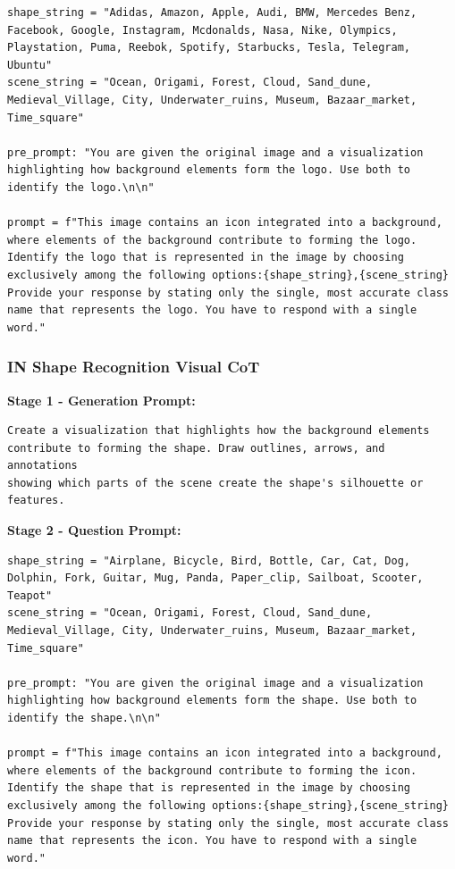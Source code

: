 \documentclass{article}
\theoremstyle{plain}
\theoremstyle{definition}
\theoremstyle{remark}
\begin{document}
\begin{verbatim}
shape_string = "Adidas, Amazon, Apple, Audi, BMW, Mercedes Benz,
Facebook, Google, Instagram, Mcdonalds, Nasa, Nike, Olympics,
Playstation, Puma, Reebok, Spotify, Starbucks, Tesla, Telegram, Ubuntu"
scene_string = "Ocean, Origami, Forest, Cloud, Sand_dune,
Medieval_Village, City, Underwater_ruins, Museum, Bazaar_market,
Time_square"

pre_prompt: "You are given the original image and a visualization
highlighting how background elements form the logo. Use both to
identify the logo.\n\n"

prompt = f"This image contains an icon integrated into a background,
where elements of the background contribute to forming the logo.
Identify the logo that is represented in the image by choosing
exclusively among the following options:{shape_string},{scene_string}
Provide your response by stating only the single, most accurate class
name that represents the logo. You have to respond with a single word."
\end{verbatim}

\subsubsection{IN Shape Recognition Visual CoT}

\textbf{Stage 1 - Generation Prompt:}

\begin{verbatim}
Create a visualization that highlights how the background elements
contribute to forming the shape. Draw outlines, arrows, and annotations
showing which parts of the scene create the shape's silhouette or
features.
\end{verbatim}

\textbf{Stage 2 - Question Prompt:}

\begin{verbatim}
shape_string = "Airplane, Bicycle, Bird, Bottle, Car, Cat, Dog,
Dolphin, Fork, Guitar, Mug, Panda, Paper_clip, Sailboat, Scooter,
Teapot"
scene_string = "Ocean, Origami, Forest, Cloud, Sand_dune,
Medieval_Village, City, Underwater_ruins, Museum, Bazaar_market,
Time_square"

pre_prompt: "You are given the original image and a visualization
highlighting how background elements form the shape. Use both to
identify the shape.\n\n"

prompt = f"This image contains an icon integrated into a background,
where elements of the background contribute to forming the icon.
Identify the shape that is represented in the image by choosing
exclusively among the following options:{shape_string},{scene_string}
Provide your response by stating only the single, most accurate class
name that represents the icon. You have to respond with a single word."
\end{verbatim}
\end{document}
